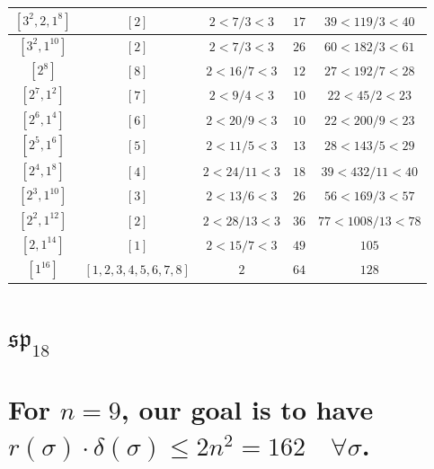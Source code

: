 \documentclass{article}%
\begin{document}
\begin{center}
\begin{longtable}{||c|c|c|c|c||}
$[3^{2}, 2, 1^{8}]$ & $[2]$ & $2 < 7/3 < 3$ & $17$ & $39 < 119/3 < 40$ \\ \hline 
$[3^{2}, 1^{10}]$ & $[2]$ & $2 < 7/3 < 3$ & $26$ & $60 < 182/3 < 61$ \\ \hline 
$[2^{8}]$ & $[8]$ & $2 < 16/7 < 3$ & $12$ & $27 < 192/7 < 28$ \\ \hline 
$[2^{7}, 1^{2}]$ & $[7]$ & $2 < 9/4 < 3$ & $10$ & $22 < 45/2 < 23$ \\ \hline 
$[2^{6}, 1^{4}]$ & $[6]$ & $2 < 20/9 < 3$ & $10$ & $22 < 200/9 < 23$ \\ \hline 
$[2^{5}, 1^{6}]$ & $[5]$ & $2 < 11/5 < 3$ & $13$ & $28 < 143/5 < 29$ \\ \hline 
$[2^{4}, 1^{8}]$ & $[4]$ & $2 < 24/11 < 3$ & $18$ & $39 < 432/11 < 40$ \\ \hline 
$[2^{3}, 1^{10}]$ & $[3]$ & $2 < 13/6 < 3$ & $26$ & $56 < 169/3 < 57$ \\ \hline 
$[2^{2}, 1^{12}]$ & $[2]$ & $2 < 28/13 < 3$ & $36$ & $77 < 1008/13 < 78$ \\ \hline 
$[2, 1^{14}]$ & $[1]$ & $2 < 15/7 < 3$ & $49$ & $105$ \\ \hline 
$[1^{16}]$ & $[1, 2, 3, 4, 5, 6, 7, 8]$ & $2$ & $64$ & $128$ \\ \hline 
    \end{longtable}
    \end{center}
\newpage

%
\section{$\mathfrak{sp}_{18}$}%
\section*{For $n=9$, our goal is to have $r(\sigma) \cdot \delta(\sigma) \leq 2n^2 = 162 \quad \forall \sigma$.}%

%
\linebreak%
\end{document}
